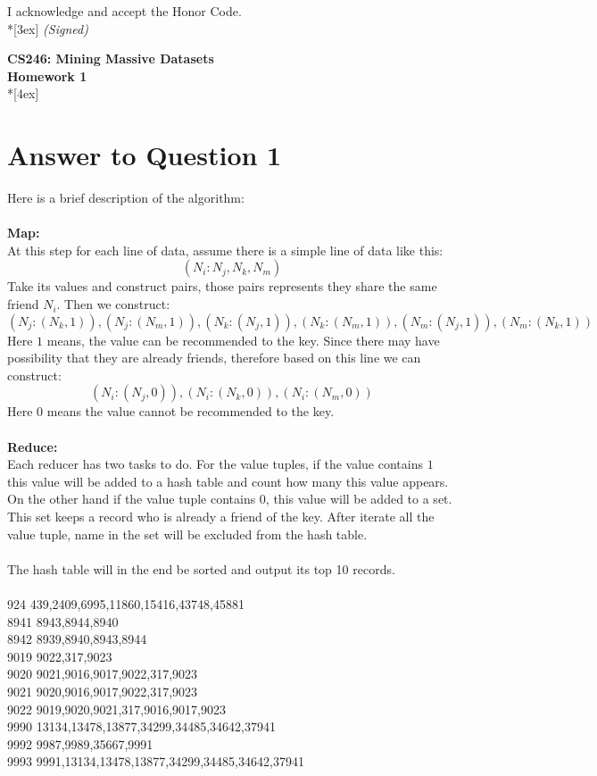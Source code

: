 \documentclass[11pt]{article}
\begin{document}
\vfill

I acknowledge and accept the Honor Code.\\*[3ex]
\bigskip
\textit{(Signed)}\hrulefill

\vfill
\vfill

\pagebreak[4]
\begin{center}
\LARGE{\bf \textsf{CS246: Mining Massive Datasets}}\\ {\bf \textsf{Homework 1}}
\\*[4ex]
\end{center}

\section*{Answer to Question 1}
Here is a brief description of the algorithm:\\
\\
\textbf{Map:}\\
At this step for each line of data, assume there is a simple line of data like this:
$$
    (N_{i}: N_{j}, N_{k}, N_{m})
$$
Take its values and construct pairs, those pairs represents they share the same friend $N_i$. Then we construct:
$$
 (N_j: (N_k, 1)), (N_j: (N_m, 1)), (N_k: (N_j, 1)), (N_k: (N_m, 1)), (N_m: (N_j, 1)), (N_m: (N_k, 1))
$$
Here $1$ means, the value can be recommended to the key. Since there may have possibility that they are already friends,
therefore based on this line we can construct:
$$
 (N_i:(N_j, 0)), (N_i:(N_k, 0)), (N_i:(N_m, 0))
$$
Here $0$ means the value cannot be recommended to the key.\\
\\
\textbf{Reduce:}\\
Each reducer has two tasks to do. For the value tuples,
if the value contains $1$ this value will be added to a hash table and count how many this value appears.
On the other hand if the value tuple contains $0$, this value will be added to a set.
This set keeps a record who is already a friend of the key.
After iterate all the value tuple, name in the set will be excluded from the hash table.\\
\\
The hash table will in the end be sorted and output its top 10 records.\\
\\
924	439,2409,6995,11860,15416,43748,45881\\
8941 8943,8944,8940\\
8942 8939,8940,8943,8944\\
9019	9022,317,9023\\
9020	9021,9016,9017,9022,317,9023\\
9021	9020,9016,9017,9022,317,9023\\
9022	9019,9020,9021,317,9016,9017,9023\\
9990	13134,13478,13877,34299,34485,34642,37941\\
9992	9987,9989,35667,9991\\
9993	9991,13134,13478,13877,34299,34485,34642,37941\\
\end{document}
